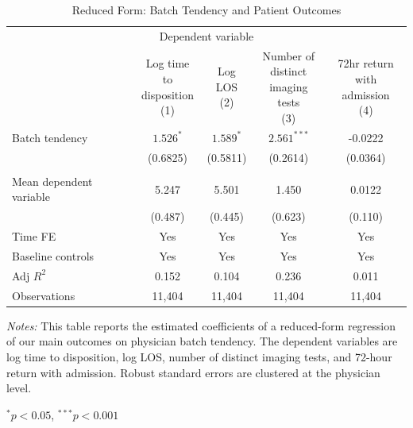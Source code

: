 \documentclass[,,nonblindrev]{informs}
\begin{document}
\begin{table}[t]
\centering
\caption{Reduced Form: Batch Tendency and Patient Outcomes}
\label{tab:red_form}
\begin{threeparttable}
\begin{tabular}{p{5cm}cccc}
\toprule
\multicolumn{5}{c}{Dependent variable} \\
\cmidrule(lr){2-5}
& \makecell[c]{Log time to \\ disposition\\(1)} 
& \makecell[c]{Log \\ LOS\\(2)} 
& \makecell[c]{Number of \\ distinct \\ imaging tests\\(3)} 
& \makecell[c]{72hr return \\ with admission\\(4)} \\
\midrule
Batch tendency  & $1.526^{*}$ & $1.589^{*}$ & $2.561^{***}$ & -0.0222 \\ 
& (0.6825) & (0.5811) & (0.2614) & (0.0364) \\[0.5em]
 & & & & \\
Mean dependent variable & 5.247  & 5.501  & 1.450  & 0.0122 \\ 
& (0.487)  & (0.445)  & (0.623) & (0.110)\\ 
Time FE & Yes & Yes & Yes & Yes \\ 
Baseline controls & Yes & Yes & Yes & Yes \\ 
\midrule
Adj $R^2$ & 0.152 & 0.104 & 0.236 & 0.011 \\ 
Observations & 11,404 & 11,404 & 11,404 & 11,404 \\
\bottomrule
\end{tabular}
\begin{tablenotes}
\footnotesize
\item \textit{Notes:} This table reports the estimated coefficients of a reduced-form regression of our main outcomes on physician batch tendency. The dependent variables are log time to disposition, log LOS, number of distinct imaging tests, and 72-hour return with admission. Robust standard errors are clustered at the physician level.
\item $^{*} p < 0.05$, $^{***} p < 0.001$
\end{tablenotes}
\end{threeparttable}
\end{table}
\end{document}
